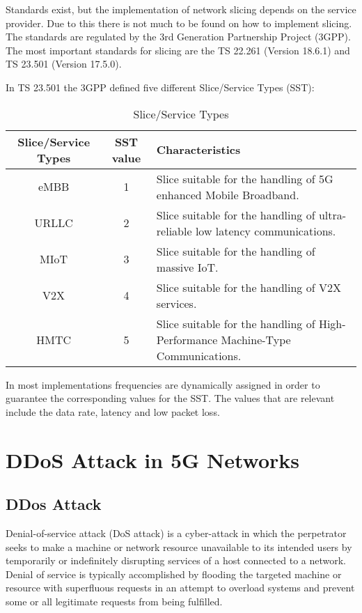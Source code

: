Standards exist, but the implementation of network slicing depends on the service provider. Due to this there is not much to be found on how to implement slicing. 
The standards are regulated by the 3rd Generation Partnership Project (3GPP). The most important standards for slicing are the TS 22.261 (Version 18.6.1) and TS 23.501 (Version 17.5.0).

In TS 23.501 the 3GPP defined five different Slice/Service Types (SST):
\begin{table}
\begin{tabularx}{\textwidth}{c|c|p{8cm}}
\textbf{Slice/Service Types} & \textbf{SST value} & \textbf{Characteristics} \\
\hline
  eMBB   & 1 & Slice suitable for the handling of 5G enhanced Mobile Broadband. \\
  URLLC   & 2 & Slice suitable for the handling of ultra- reliable low latency communications. \\
  MIoT   & 3 & Slice suitable for the handling of massive IoT. \\
  V2X   & 4 & Slice suitable for the handling of V2X services. \\
  HMTC   & 5 & Slice suitable for the handling of High-Performance Machine-Type
Communications. \\
\end{tabularx}
\caption{Slice/Service Types}
\label{t:slice/service types}
\end{table}

In most implementations frequencies are dynamically assigned in order to guarantee the corresponding values for the SST. The values that are relevant include the data rate, latency and low packet loss.

\section{DDoS Attack in 5G Networks}
\subsection{DDos Attack}
Denial-of-service attack (DoS attack) is a cyber-attack in which the perpetrator seeks to make a machine or network resource unavailable to its intended users by temporarily or indefinitely disrupting services of a host connected to a network. Denial of service is typically accomplished by flooding the targeted machine or resource with superfluous requests in an attempt to overload systems and prevent some or all legitimate requests from being fulfilled.


